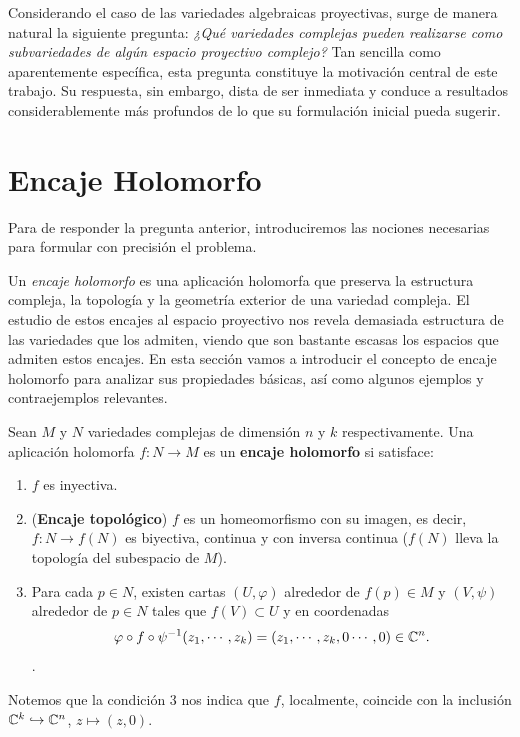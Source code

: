     Considerando el caso de las variedades algebraicas proyectivas, surge de manera natural la siguiente pregunta: \textit{¿Qué variedades complejas pueden realizarse como subvariedades de algún espacio proyectivo complejo?} Tan sencilla como aparentemente específica, esta pregunta constituye la motivación central de este trabajo. Su respuesta, sin embargo, dista de ser inmediata y conduce a resultados considerablemente más profundos de lo que su formulación inicial pueda sugerir.
    
\section{Encaje Holomorfo}
	
	Para de responder la pregunta anterior, introduciremos las nociones necesarias para formular con precisión el problema.
	
	Un \textit{encaje holomorfo} es una aplicación holomorfa que preserva la estructura compleja, la topología y la geometría exterior de una variedad compleja. El estudio de estos encajes al espacio proyectivo nos revela demasiada estructura de las variedades que los admiten, viendo que son bastante escasas los espacios que admiten estos encajes. En esta sección vamos a introducir el concepto de encaje holomorfo para analizar sus propiedades básicas, así como algunos ejemplos y contraejemplos relevantes.
	    
    \begin{definition}
        Sean $M$ y $N$ variedades complejas de dimensión $n$ y $k$ respectivamente. Una aplicación holomorfa $f:N\to M$ es un \textbf{encaje holomorfo} si satisface:
        \begin{enumerate}
            \item $f$ es inyectiva.
            \item (\textbf{Encaje topológico}) $f$ es un homeomorfismo con su imagen, es decir, $f:N\to f(N)$ es biyectiva, continua y con inversa continua ($f(N)$ lleva la topología del subespacio de $M$).
            \item Para cada $p\in N$, existen cartas $(U,\varphi)$ alrededor de $f(p)\in M$ y $(V,\psi)$ alrededor de $p\in N$ tales que $f(V)\subset U$ y en coordenadas
            \begin{equation*}
                \varphi\circ f\circ\psi^{-1}(z_1,\cdots,z_k)=(z_1,\cdots,z_k,0\cdots,0)\in\mathbb{C}^n.
            \end{equation*}.
        \end{enumerate}
        Notemos que la condición $3$ nos indica que $f$, localmente, coincide con la inclusión $\mathbb{C}^k\hookrightarrow\mathbb{C}^n$, $z\mapsto (z,0)$.
    \end{definition}

